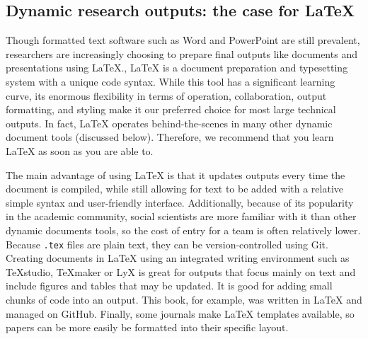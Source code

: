 \subsection{Dynamic research outputs: the case for {\LaTeX}}

Though formatted text software such as Word and PowerPoint are still prevalent,
researchers are increasingly choosing to prepare final outputs
like documents and presentations using {\LaTeX}.\index{{\LaTeX}},
{\LaTeX} is a document preparation and typesetting system with a unique code syntax.
While this tool has a significant learning curve,
its enormous flexibility in terms of operation, collaboration, output formatting, and styling
make it our preferred choice for most large technical outputs.
In fact, {\LaTeX} operates behind-the-scenes in many other dynamic document tools (discussed below).
Therefore, we recommend that you learn {\LaTeX} as soon as you are able to.

The main advantage of using {\LaTeX} is that it updates outputs every time the document is compiled,
while still allowing for text to be added with a relative simple syntax and user-friendly interface.
Additionally, because of its popularity in the academic community,
social scientists are more familiar with it than other dynamic documents tools,
so the cost of entry for a team is often relatively lower.
Because \texttt{.tex} files are plain text, 
they can be version-controlled using Git.
Creating documents in {\LaTeX} using an integrated writing environment such as TeXstudio, TeXmaker or LyX
is great for outputs that focus mainly on text
and include figures and tables that may be updated.
It is good for adding small chunks of code into an output.
This book, for example, was written in {\LaTeX} and managed on GitHub.
Finally, some journals make {\LaTeX} templates available,
so papers can be more easily be formatted into their specific layout. 
	

